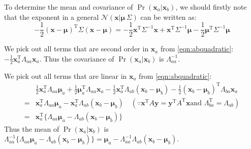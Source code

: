 To determine the mean and covariance of
$\Pr(\mathbf{x}_{a}\vert\mathbf{x}_{b})$, we should firstly note that
the exponent in a general
$\mathcal{N}(\mathbf{x}\vert\boldsymbol{\mu}\,\Sigma)$ can be written
as:
\begin{equation}
-\frac{1}{2}(\mathbf{x}-\boldsymbol{\mu})^{\mathrm{T}}\Sigma(\mathbf{x}-\boldsymbol{\mu})=-\frac{1}{2}\mathbf{x}^{\mathrm{T}}\Sigma^{-1}\mathbf{x}+\mathbf{x}^{\mathrm{T}}\Sigma^{-1}\boldsymbol{\mu}-\frac{1}{2}\boldsymbol{\mu}^{\mathrm{T}}\Sigma^{-1}\boldsymbol{\mu}
\label{eqn:expandexponent}
\end{equation}


We pick out all terms that are second order in $\mathbf{x}_{a}$ from
\eqref{eqn:abquadratic}:
$-\frac{1}{2}\mathbf{x}_{a}^{\mathrm{T}}\Lambda_{aa}\mathbf{x}_{a}$.
Thus the covariance of $\Pr(\mathbf{x}_{a}\vert\mathbf{x}_{b})$ is
$\Lambda_{aa}^{-1}$.


We pick out all terms that are linear in $\mathbf{x}_{a}$ from
\eqref{eqn:abquadratic}:
\begin{equation}
\begin{split}
&\frac{1}{2}\mathbf{x}_{a}^{\mathrm{T}}\Lambda_{aa}\boldsymbol{\mu}_{a}+\frac{1}{2}\boldsymbol{\mu}_{a}^{\mathrm{T}}\Lambda_{aa}\mathbf{x}_{a}-\frac{1}{2}\mathbf{x}_{a}^{\mathrm{T}}\Lambda_{ab}(\mathbf{x}_{b}-\boldsymbol{\mu}_{b})-\frac{1}{2}(\mathbf{x}_{b}-\boldsymbol{\mu}_{b})^{\mathrm{T}}\Lambda_{ba}\mathbf{x}_{a}\\
=&\mathbf{x}_{a}^{\mathrm{T}}\Lambda_{aa}\boldsymbol{\mu}_{a}-\mathbf{x}_{a}^{\mathrm{T}}\Lambda_{ab}(\mathbf{x}_{b}-\boldsymbol{\mu}_{b})\quad{}(\because{}\mathbf{x}^{\mathrm{T}}A\mathbf{y}=\mathbf{y}^{\mathrm{T}}A^{\mathrm{T}}\mathbf{x}\text{
        and }\Lambda_{ba}^{\mathrm{T}}=\Lambda_{ab})\\
=&\mathbf{x}_{a}^{\mathrm{T}}\{\Lambda_{aa}\boldsymbol{\mu}_{a}-\Lambda_{ab}(\mathbf{x}_{b}-\boldsymbol{\mu}_{b})\}
\end{split}
\label{eqn:linearinxa}
\end{equation}
Thus the mean of $\Pr(\mathbf{x}_{a}\vert\mathbf{x}_b)$ is
$\Lambda_{aa}^{-1}\{\Lambda_{aa}\boldsymbol{\mu}_{a}-\Lambda_{ab}(\mathbf{x}_{b}-\boldsymbol{\mu}_{b})\}=\boldsymbol{\mu}_{a}-\Lambda_{aa}^{-1}\Lambda_{ab}(\mathbf{x}_{b}-\boldsymbol{\mu}_{b})$.


